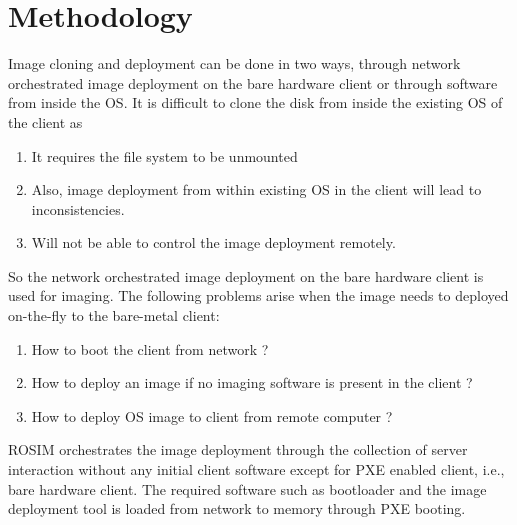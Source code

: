 \documentclass[a4paper,12pt]{article}
\begin{document}


\newpage

\section{\fontsize{16pt}{1em} Methodology}
Image cloning and deployment can be done in two ways, through network orchestrated image deployment on the bare hardware client or through software from inside the OS. It is difficult to clone the disk from inside the existing  OS of the client as 
\begin{enumerate}[label=\roman*.]
 \item It requires the file system to be unmounted 
 \item Also, image deployment from within existing OS in the client will lead to inconsistencies. 
  \item Will not be able to control the image deployment remotely.
 \end{enumerate}
So the network orchestrated image deployment on the bare hardware client is used for imaging. The following problems arise when the image needs to deployed on-the-fly to the bare-metal client:
\begin{enumerate}[label=\roman*.]
 \item How to boot the client from network ? 
 \item How to deploy an image if no imaging software is present in the client ?
\item How to deploy OS image to client from remote computer ?
\end{enumerate}
ROSIM orchestrates the image deployment through the collection of server interaction without any initial client software except for PXE enabled client, i.e., bare hardware client. The required software such as bootloader and the image deployment tool is loaded from network to memory through PXE booting.
\end{document}
